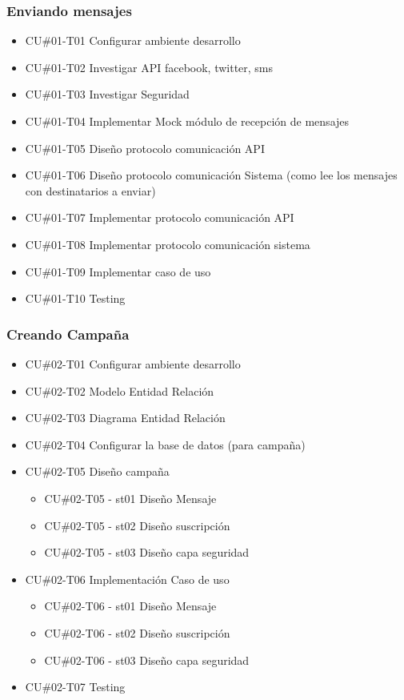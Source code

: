 \documentclass[a4paper, 11pt]{article}
\begin{document}
\subsubsection{Enviando mensajes}
\begin{itemize}
\item{CU\#01-T01} Configurar ambiente desarrollo
\item{CU\#01-T02} Investigar API facebook, twitter, sms
\item{CU\#01-T03} Investigar Seguridad
\item{CU\#01-T04} Implementar Mock m\'odulo de recepci\'on de mensajes
\item{CU\#01-T05} Dise\~no protocolo comunicaci\'on API 
\item{CU\#01-T06} Dise\~no protocolo comunicaci\'on Sistema  (como lee los mensajes con destinatarios a enviar)
\item{CU\#01-T07} Implementar protocolo comunicaci\'on API
\item{CU\#01-T08} Implementar protocolo comunicaci\'on sistema
\item{CU\#01-T09} Implementar caso de uso
\item{CU\#01-T10} Testing
\end{itemize}

\subsubsection{Creando Campa\~na}
\begin{itemize}
\item{CU\#02-T01} Configurar ambiente desarrollo
\item{CU\#02-T02} Modelo Entidad Relaci\'on
\item{CU\#02-T03} Diagrama Entidad Relaci\'on
\item{CU\#02-T04} Configurar la base de datos (para campa\~na)
\item{CU\#02-T05} Dise\~no campa\~na
\begin{itemize}
\item{CU\#02-T05 - st01} Dise\~no Mensaje
\item{CU\#02-T05 - st02} Dise\~no suscripci\'on
\item{CU\#02-T05 - st03} Dise\~no capa seguridad
\end{itemize}
\item{CU\#02-T06} Implementaci\'on Caso de uso
\begin{itemize}
\item{CU\#02-T06 - st01} Dise\~no Mensaje
\item{CU\#02-T06 - st02} Dise\~no suscripci\'on
\item{CU\#02-T06 - st03} Dise\~no capa seguridad
\end{itemize}
\item{CU\#02-T07} Testing
\end{itemize}
\end{document}
